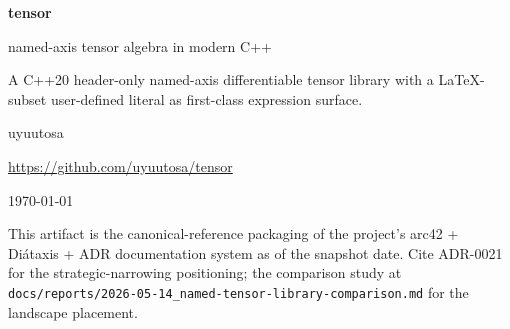%
%

\begin{titlepage}
  \centering
  \vspace*{2cm}

  {\Huge\bfseries tensor\par}
  \vspace{0.5cm}
  {\Large named-axis tensor algebra in modern C++\par}

  \vspace{2cm}
  {\large A C++20 header-only named-axis differentiable tensor
   library with a \LaTeX-subset user-defined literal as
   first-class expression surface.\par}

  \vfill

  {\large uyuutosa\par}
  \vspace{0.3cm}
  {\normalsize \url{https://github.com/uyuutosa/tensor}\par}

  \vspace{1cm}
  {\normalsize \today\par}

  \vspace{0.3cm}
  {\small This artifact is the canonical-reference packaging of
   the project's arc42 + Diátaxis + ADR documentation system as of
   the snapshot date. Cite ADR-0021 for the strategic-narrowing
   positioning; the comparison study at
   \texttt{docs/reports/2026-05-14\_named-tensor-library-comparison.md}
   for the landscape placement.\par}
\end{titlepage}

\clearpage
